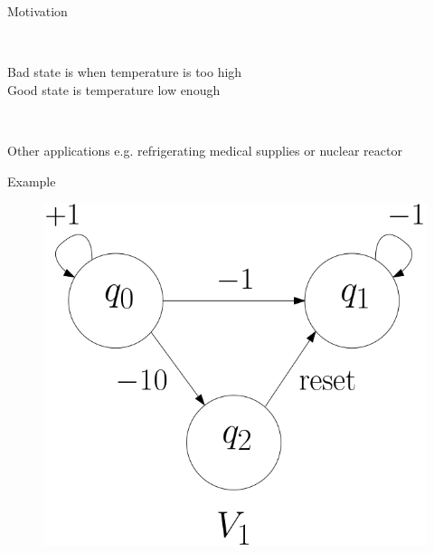 \documentclass{beamer}
\begin{document}
\begin{frame}{Motivation}
\begin{columns}[T]
\phantom{Fridge.png} \\
{\sf Bad} state is when temperature is too high \\
 {\sf Good} state is temperature low enough \\

\end{columns}

\pause

\phantom{Fridge.png} \\
Other applications e.g. refrigerating medical supplies or nuclear reactor 

  \end{frame}
  \begin{frame}{Example}
  
  
   \begin{center}
 	\begin{figure}
 	\vspace{.06cm}
\includegraphics[width=.50\textwidth]{FigA}
	\end{figure}
\end{center}  

  \end{frame}
\end{document}
